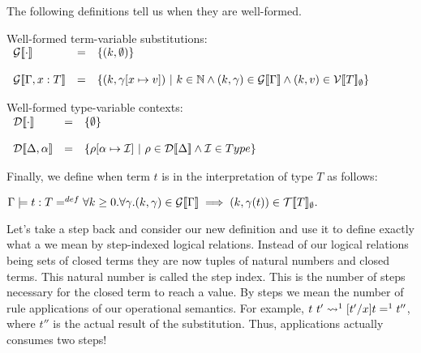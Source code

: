 The following definitions tell us when they are well-formed.
\begin{definition}
  \label{def:well-formed_term_var_subs}
  Well-formed term-variable substitutions:\\
  \begin{math}
    \begin{array}{lllll}
      \ginterp{\cdot} & = & \{ (k,\emptyset) \}\\
      & \\
      \ginterp{\Gamma,x:T} & = & 
      \{ (k, \gamma[x \mapsto v])\ |\ k \in \nat \land (k, \gamma) \in \ginterp{\Gamma} \land 
      (k,v) \in \vinterp{T}_\emptyset \}
    \end{array}
  \end{math}
\end{definition}

\begin{definition}
  \label{def:well-formed_type_var_subs}
  Well-formed type-variable contexts:\\
  \begin{math}
    \begin{array}{lll}
      \dinterp{\cdot} & = & \{ \emptyset \}\\
      & \\
      \dinterp{\Delta,\alpha} & = & \{ \rho[\alpha \mapsto \interpset]\ |\ 
      \rho \in \dinterp{\Delta} \land \interpset \in Type \}\\
    \end{array}
  \end{math}
\end{definition}
\noindent
Finally, we define when term $t$ is in the interpretation of type $T$ as follows:
\begin{center}
  \begin{math}
    \Gamma \models t : T =^{def} \forall k \geq 0 . \forall \gamma.(k, \gamma) \in 
    \mathcal{G}[\negthinspace[\Gamma]\negthinspace] \implies (k, \gamma(t)) \in \mathcal{T}[\negthinspace[T]\negthinspace]_\emptyset.
  \end{math}
\end{center}

Let's take a step back and consider our new definition and use it to
define exactly what a we mean by step-indexed logical relations.
Instead of our logical relations being sets of closed terms they are
now tuples of natural numbers and closed terms.  This natural number
is called the step index.  This is the number of steps necessary for
the closed term to reach a value.  By steps we mean the number of rule
applications of our operational semantics.  
For example, $t\ t'
\rightsquigarrow^1 [t'/x]t =^1 t''$, where $t''$ is the actual result of the
substitution.  Thus, applications actually consumes two steps!

